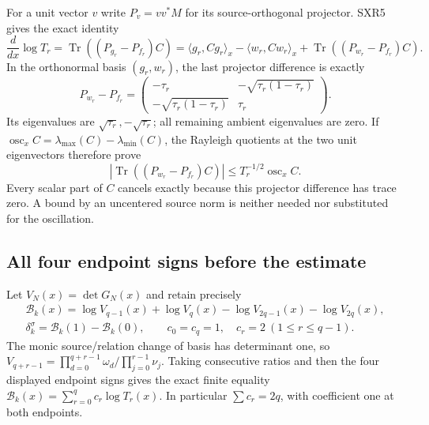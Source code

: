 \documentclass[11pt,a4paper]{article}
\begin{document}
For a unit vector $v$ write $P_v=vv^*M$ for its source-orthogonal
projector. SXR5 gives the exact identity
\begin{equation}\tag{SXR8}
 \frac{d}{dx}\log T_r
   =\operatorname{Tr}((P_{g_r}-P_{f_r})C)
   =\langle g_r,Cg_r\rangle_x-\langle w_r,Cw_r\rangle_x
      +\operatorname{Tr}((P_{w_r}-P_{f_r})C).
\end{equation}
In the orthonormal basis $(g_r,w_r)$, the last projector difference
is exactly
\[
 P_{w_r}-P_{f_r}=
 \begin{pmatrix}
 -\tau_r&-\sqrt{\tau_r(1-\tau_r)}\\
 -\sqrt{\tau_r(1-\tau_r)}&\tau_r
 \end{pmatrix}.
\]
Its eigenvalues are $\sqrt{\tau_r},-\sqrt{\tau_r}$; all remaining
ambient eigenvalues are zero. If
$\operatorname{osc}_x C=\lambda_{\max}(C)-\lambda_{\min}(C)$,
the Rayleigh quotients at the two unit eigenvectors therefore prove
\begin{equation}\tag{SXR9}
 |\operatorname{Tr}((P_{w_r}-P_{f_r})C)|
          \le T_r^{-1/2}\operatorname{osc}_x C.
\end{equation}
Every scalar part of $C$ cancels exactly because this projector
difference has trace zero. A bound by an uncentered source norm is
neither needed nor substituted for the oscillation.

\subsection{All four endpoint signs before the estimate}

Let $V_N(x)=\det G_N(x)$ and retain precisely
\begin{equation}\tag{SXR10}
\begin{gathered}
 \mathcal B_k(x)=\log V_{q-1}(x)+\log V_q(x)
                     -\log V_{2q-1}(x)-\log V_{2q}(x),\\
 \delta_k^\sigma=\mathcal B_k(1)-\mathcal B_k(0),\qquad
 c_0=c_q=1,\quad c_r=2\ (1\le r\le q-1).
\end{gathered}
\end{equation}
The monic source/relation change of basis has determinant one, so
$V_{q+r-1}=\prod_{d=0}^{q+r-1}\omega_d/\prod_{j=0}^{r-1}\nu_j$.
Taking consecutive ratios and then the four displayed endpoint signs
gives the exact finite equality
$\mathcal B_k(x)=\sum_{r=0}^q c_r\log T_r(x)$.
In particular $\sum c_r=2q$, with coefficient one at both endpoints.
\end{document}
